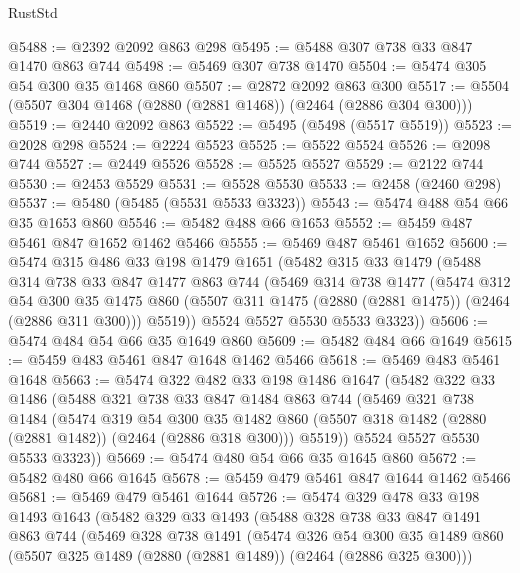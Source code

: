 \begin{lexlean}{RustStd}
\begin{coremodule}
@5488 := @2392 @2092 @863 @298
@5495 := @5488 @307 @738 @33 @847 @1470 @863 @744
@5498 := @5469 @307 @738 @1470
@5504 := @5474 @305 @54 @300 @35 @1468 @860
@5507 := @2872 @2092 @863 @300
@5517 := @5504 (@5507 @304 @1468 (@2880 (@2881 @1468)) (@2464 (@2886 @304 @300)))
@5519 := @2440 @2092 @863
@5522 := @5495 (@5498 (@5517 @5519))
@5523 := @2028 @298
@5524 := @2224 @5523
@5525 := @5522 @5524
@5526 := @2098 @744
@5527 := @2449 @5526
@5528 := @5525 @5527
@5529 := @2122 @744
@5530 := @2453 @5529
@5531 := @5528 @5530
@5533 := @2458 (@2460 @298)
@5537 := @5480 (@5485 (@5531 @5533 @3323))
@5543 := @5474 @488 @54 @66 @35 @1653 @860
@5546 := @5482 @488 @66 @1653
@5552 := @5459 @487 @5461 @847 @1652 @1462 @5466
@5555 := @5469 @487 @5461 @1652
@5600 := @5474
    @315
    @486
    @33
    @198
    @1479
    @1651
    (@5482
      @315
      @33
      @1479
      (@5488
        @314
        @738
        @33
        @847
        @1477
        @863
        @744
        (@5469
          @314
          @738
          @1477
          (@5474
            @312
            @54
            @300
            @35
            @1475
            @860
            (@5507 @311 @1475 (@2880 (@2881 @1475)) (@2464 (@2886 @311 @300)))
            @5519))
        @5524
        @5527
        @5530
        @5533
        @3323))
@5606 := @5474 @484 @54 @66 @35 @1649 @860
@5609 := @5482 @484 @66 @1649
@5615 := @5459 @483 @5461 @847 @1648 @1462 @5466
@5618 := @5469 @483 @5461 @1648
@5663 := @5474
    @322
    @482
    @33
    @198
    @1486
    @1647
    (@5482
      @322
      @33
      @1486
      (@5488
        @321
        @738
        @33
        @847
        @1484
        @863
        @744
        (@5469
          @321
          @738
          @1484
          (@5474
            @319
            @54
            @300
            @35
            @1482
            @860
            (@5507 @318 @1482 (@2880 (@2881 @1482)) (@2464 (@2886 @318 @300)))
            @5519))
        @5524
        @5527
        @5530
        @5533
        @3323))
@5669 := @5474 @480 @54 @66 @35 @1645 @860
@5672 := @5482 @480 @66 @1645
@5678 := @5459 @479 @5461 @847 @1644 @1462 @5466
@5681 := @5469 @479 @5461 @1644
@5726 := @5474
    @329
    @478
    @33
    @198
    @1493
    @1643
    (@5482
      @329
      @33
      @1493
      (@5488
        @328
        @738
        @33
        @847
        @1491
        @863
        @744
        (@5469
          @328
          @738
          @1491
          (@5474
            @326
            @54
            @300
            @35
            @1489
            @860
            (@5507 @325 @1489 (@2880 (@2881 @1489)) (@2464 (@2886 @325 @300)))

\end{coremodule}
\end{lexlean}
